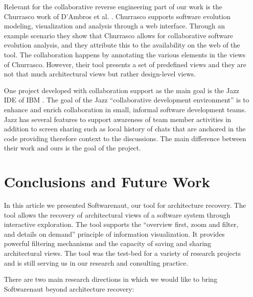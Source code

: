 \documentclass[preprint,12pt]{elsarticle}
\begin{document}
Relevant for the collaborative reverse engineering part of our work is the Churrasco work of D’Ambros et al. \cite{dambros-churrasco}. Churrasco supports software evolution modeling, visualization and analysis through a web interface. 
Through an example scenario they show that Churrasco allows for collaborative software evolution analysis, and they attribute this to the availability on the web of the tool. The collaboration happens by annotating the various elements in the views of Churrasco. However, their tool presents a set of predefined views and they are not that much architectural views but rather design-level views. 

One project developed with collaboration support as the main goal is the Jazz IDE of IBM \cite{hupfer-jazz}. The goal of the Jazz ``collaborative development environment'' is to enhance and enrich collaboration in small, informal software development teams. Jazz has several features to support awareness of team member activities in addition to screen sharing such as local history of chats that are anchored in the code providing therefore context to the discussions. The main difference between their work and ours is the goal of the project.





\newpage
\section {Conclusions and Future Work}
\label {sec:conc}

In this article we presented Softwarenaut, our tool for architecture recovery. The tool allows the recovery of architectural views of a software system through interactive exploration. The tool supports the ``overview first, zoom and filter, and details on demand'' principle of information visualization. It provides powerful filtering mechanisms and the capacity of saving and sharing architectural views. The tool was the test-bed for a variety of research projects and is still serving us in our research and consulting practice. 

There are two main research directions in which we would like to bring Softwarenaut beyond architecture recovery:
\end{document}
